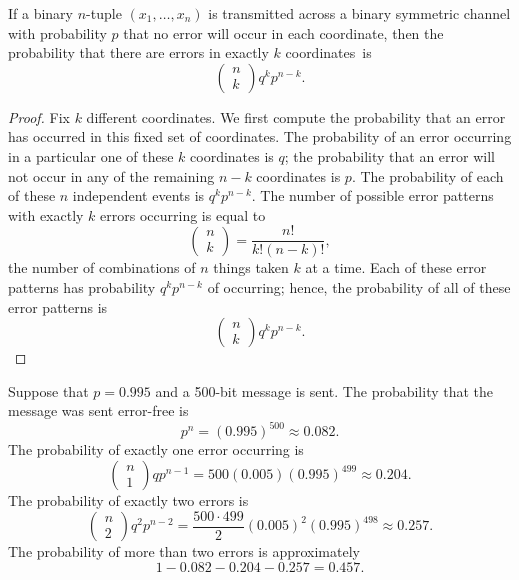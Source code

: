  \begin{prop}{}
If a binary $n$-tuple $(x_{1}, \ldots, x_{n})$ is transmitted across a
binary symmetric channel with probability $p$ that no error will occur
in each coordinate, then the probability that there are errors in
exactly $k$ coordinates~is 
\[
\left(
\begin{array}{c}
n \\ k
\end{array}
\right)
 q^kp^{n-k}.
\]
\end{prop}
  
\begin{proof}
Fix $k$ different coordinates. We first compute the probability that
an error has occurred in this fixed set of coordinates. The
probability of an error occurring in a particular one of these $k$
coordinates is $q$; the probability that an error will not occur
in any of the remaining $n-k$ coordinates is $p$. The
probability of each of these $n$ independent events is
$q^{k}p^{n-k}$. The number of possible error patterns with exactly $k$
errors occurring is equal to 
\[
\left(
\begin{array}{c}
n \\ k
\end{array}
\right)
= \frac{n!}{k!(n-k)!},
\]
the number of combinations of $n$ things taken $k$ at a time. Each of
these error patterns has probability $q^{k}p^{n-k}$ of occurring;
hence, the probability of all of these error patterns is
\[
\left(
\begin{array}{c}
n \\ k
\end{array}
\right)
q^{k}p^{n-k}.
\]
\end{proof}
 
 
\begin{example}{}
Suppose that $p = 0.995$ and a 500-bit message is sent. The
probability that the message was sent error-free is 
\[
p^{n} = (0.995)^{500} \approx 0.082.
\]
The probability of exactly one error occurring is
\[
\left(
\begin{array}{c}
n \\ 1
\end{array}
\right)
qp^{n-1}= 500(0.005)(0.995)^{499}
\approx 0.204.
\]
The probability of exactly two errors is
\[
\left(
\begin{array}{c}
n \\ 2
\end{array}
\right)
q^{2}p^{n-2}=
\frac{500 \cdot 499}{2}(0.005)^{2}(0.995)^{498} \approx
0.257.
\]
The probability of more than two errors is approximately
\[
1-0.082-0.204 -0.257=0.457.
\]
\end{example}
 
